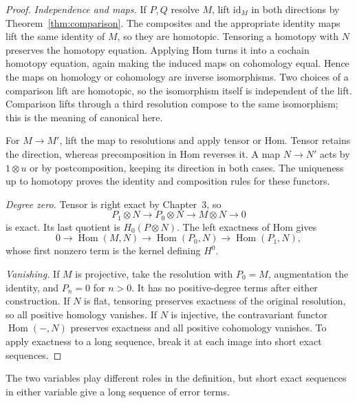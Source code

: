 \begin{proof}
\emph{Independence and maps.} If $P,Q$ resolve $M$, lift $\mathrm{id}_M$ in both directions by Theorem~\ref{thm:comparison}. The composites and the appropriate identity maps lift the same identity of $M$, so they are homotopic. Tensoring a homotopy with $N$ preserves the homotopy equation. Applying Hom turns it into a cochain homotopy equation, again making the induced maps on cohomology equal. Hence the maps on homology or cohomology are inverse isomorphisms. Two choices of a comparison lift are homotopic, so the isomorphism itself is independent of the lift. Comparison lifts through a third resolution compose to the same isomorphism; this is the meaning of canonical here.

For $M\to M'$, lift the map to resolutions and apply tensor or Hom. Tensor retains the direction, whereas precomposition in Hom reverses it. A map $N\to N'$ acts by $1\otimes u$ or by postcomposition, keeping its direction in both cases. The uniqueness up to homotopy proves the identity and composition rules for these functors.

\emph{Degree zero.} Tensor is right exact by Chapter~3, so
\[
P_1\otimes N\longrightarrow P_0\otimes N
\longrightarrow M\otimes N\longrightarrow0
\]
is exact. Its last quotient is $H_0(P\otimes N)$. The left exactness of Hom gives
\[
0\longrightarrow\operatorname{Hom}(M,N)
\longrightarrow\operatorname{Hom}(P_0,N)
\longrightarrow\operatorname{Hom}(P_1,N),
\]
whose first nonzero term is the kernel defining $H^0$.

\emph{Vanishing.} If $M$ is projective, take the resolution with $P_0=M$, augmentation the identity, and $P_n=0$ for $n>0$. It has no positive-degree terms after either construction. If $N$ is flat, tensoring preserves exactness of the original resolution, so all positive homology vanishes. If $N$ is injective, the contravariant functor $\operatorname{Hom}(-,N)$ preserves exactness and all positive cohomology vanishes. To apply exactness to a long sequence, break it at each image into short exact sequences.
\end{proof}

The two variables play different roles in the definition, but short exact sequences in either variable give a long sequence of error terms.

